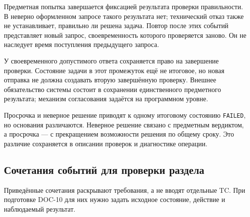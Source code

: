\documentclass[12pt,a4paper]{article}
\begin{document}
Предметная попытка завершается фиксацией результата проверки правильности. В неверно оформленном запросе такого результата нет; технический отказ также не устанавливает, правильно ли решена задача. Повтор после этих событий представляет новый запрос, своевременность которого проверяется заново. Он не наследует время поступления предыдущего запроса.

У своевременного допустимого ответа сохраняется право на завершение проверки. Состояние задачи в этот промежуток ещё не итоговое, но новая отправка не должна создавать вторую завершённую проверку. Внешнее обязательство системы состоит в сохранении единственного предметного результата; механизм согласования задаётся на программном уровне.

Просрочка и неверное решение приводят к одному итоговому состоянию \texttt{FAILED}, но основания различаются. Неверное решение связано с предметным вердиктом, а просрочка --- с прекращением возможности решения по общему сроку. Это различие сохраняется в описании проверок и диагностике операции.

\subsection{Сочетания событий для проверки раздела}\label{ux441ux43eux447ux435ux442ux430ux43dux438ux44f-ux441ux43eux431ux44bux442ux438ux439-ux434ux43bux44f-ux43fux440ux43eux432ux435ux440ux43aux438-ux440ux430ux437ux434ux435ux43bux430}

\hypertarget{сочетания-событий-для-проверки-раздела}{}

Приведённые сочетания раскрывают требования, а не вводят отдельные TC. При подготовке DOC-10 для них нужно задать исходное состояние, действие и наблюдаемый результат.
\end{document}
